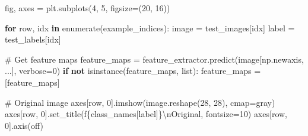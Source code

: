 \documentclass[
  letterpaper,
  DIV=11,
  numbers=noendperiod]{scrreprt}
\newenvironment{Shaded}{\begin{snugshade}}{\end{snugshade}}
\newcommand{\BuiltInTok}[1]{\textcolor[rgb]{0.00,0.23,0.31}{#1}}
\newcommand{\CharTok}[1]{\textcolor[rgb]{0.13,0.47,0.30}{#1}}
\newcommand{\CommentTok}[1]{\textcolor[rgb]{0.37,0.37,0.37}{#1}}
\newcommand{\ControlFlowTok}[1]{\textcolor[rgb]{0.00,0.23,0.31}{\textbf{#1}}}
\newcommand{\DecValTok}[1]{\textcolor[rgb]{0.68,0.00,0.00}{#1}}
\newcommand{\KeywordTok}[1]{\textcolor[rgb]{0.00,0.23,0.31}{\textbf{#1}}}
\newcommand{\NormalTok}[1]{\textcolor[rgb]{0.00,0.23,0.31}{#1}}
\newcommand{\OperatorTok}[1]{\textcolor[rgb]{0.37,0.37,0.37}{#1}}
\newcommand{\SpecialCharTok}[1]{\textcolor[rgb]{0.37,0.37,0.37}{#1}}
\newcommand{\SpecialStringTok}[1]{\textcolor[rgb]{0.13,0.47,0.30}{#1}}
\newcommand{\StringTok}[1]{\textcolor[rgb]{0.13,0.47,0.30}{#1}}
\begin{document}
\begin{Shaded}
\begin{Highlighting}[]
\NormalTok{    fig, axes }\OperatorTok{=}\NormalTok{ plt.subplots(}\DecValTok{4}\NormalTok{, }\DecValTok{5}\NormalTok{, figsize}\OperatorTok{=}\NormalTok{(}\DecValTok{20}\NormalTok{, }\DecValTok{16}\NormalTok{))}
    
    \ControlFlowTok{for}\NormalTok{ row, idx }\KeywordTok{in} \BuiltInTok{enumerate}\NormalTok{(example\_indices):}
\NormalTok{        image }\OperatorTok{=}\NormalTok{ test\_images[idx]}
\NormalTok{        label }\OperatorTok{=}\NormalTok{ test\_labels[idx]}
        
        \CommentTok{\# Get feature maps}
\NormalTok{        feature\_maps }\OperatorTok{=}\NormalTok{ feature\_extractor.predict(image[np.newaxis, ...], verbose}\OperatorTok{=}\DecValTok{0}\NormalTok{)}
        \ControlFlowTok{if} \KeywordTok{not} \BuiltInTok{isinstance}\NormalTok{(feature\_maps, }\BuiltInTok{list}\NormalTok{):}
\NormalTok{            feature\_maps }\OperatorTok{=}\NormalTok{ [feature\_maps]}
        
        \CommentTok{\# Original image}
\NormalTok{        axes[row, }\DecValTok{0}\NormalTok{].imshow(image.reshape(}\DecValTok{28}\NormalTok{, }\DecValTok{28}\NormalTok{), cmap}\OperatorTok{=}\StringTok{\textquotesingle{}gray\textquotesingle{}}\NormalTok{)}
\NormalTok{        axes[row, }\DecValTok{0}\NormalTok{].set\_title(}\SpecialStringTok{f\textquotesingle{}}\SpecialCharTok{\{}\NormalTok{class\_names[label]}\SpecialCharTok{\}}\CharTok{\textbackslash{}n}\SpecialStringTok{Original\textquotesingle{}}\NormalTok{, fontsize}\OperatorTok{=}\DecValTok{10}\NormalTok{)}
\NormalTok{        axes[row, }\DecValTok{0}\NormalTok{].axis(}\StringTok{\textquotesingle{}off\textquotesingle{}}\NormalTok{)}
        

\end{Highlighting}
\end{Shaded}
\end{document}
